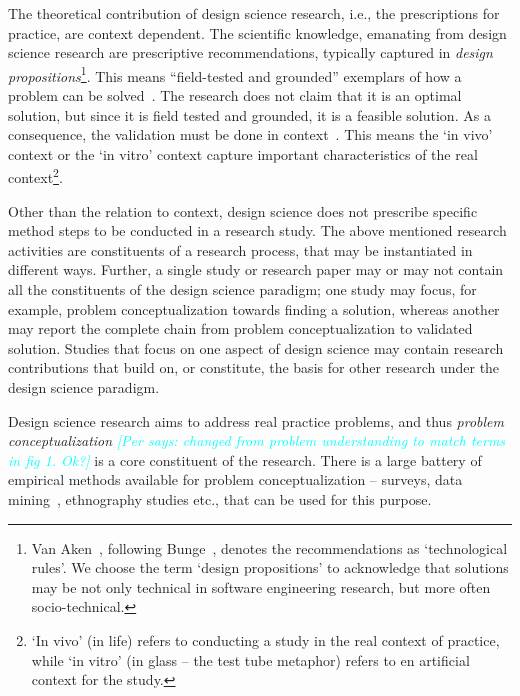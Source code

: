 \documentclass[graybox]{svmult}
\newcommand{\per}[1]{\textcolor{cyan}{{\it [Per says: #1]}}}
\newcommand{\per}[1]{}
\begin{document}
The theoretical contribution of design science research, i.e., the prescriptions for practice, are context dependent. The scientific knowledge, emanating from design science research are prescriptive recommendations, typically captured in \emph{design propositions}\footnote{Van Aken~\cite{van_aken_management_2004}, following Bunge~\cite{bunge_philosophy_1998}, denotes the recommendations as `technological rules'. We choose the term `design propositions' to acknowledge that solutions may be not only technical in software engineering research, but more often socio-technical.}. This means ``field-tested and grounded'' exemplars of how a problem can be solved~\cite{van_aken_management_2004}. The research does not claim that it is an optimal solution, but since it is field tested and grounded, it is a feasible solution.
As a consequence, the validation must be done in context~\cite{wieringa_what_2014}.  This means the  `in vivo' context or the `in vitro' context capture important characteristics of the real context\footnote{`In vivo' (in life) refers to conducting a study in the real context of practice, while `in vitro' (in glass -- the test tube metaphor) refers to en artificial context for the study.}.  

Other than the relation to context, design science does not prescribe specific method steps to be conducted in a research study. The above mentioned research activities are constituents of  a research process, that may be instantiated in different ways. 
Further, a single study or research paper may or may not contain all the constituents of the design science paradigm; one study may focus, for example,  problem conceptualization towards finding a solution, whereas another may report the complete chain from problem conceptualization to validated solution. Studies that focus on one aspect of design science may contain research contributions that build on, or constitute, the basis for other research under the design science paradigm.


Design science research aims to address real practice problems, and thus \emph{problem conceptualization} \per{changed from problem understanding to match terms in fig 1. Ok?} is a core constituent of the research. There is a large battery of empirical methods available for problem conceptualization -- surveys, data mining~\cite{MenziesDataMining2016}, ethnography studies \cite{SharpEthnography2016} etc., that can be used for this purpose. 
\end{document}
